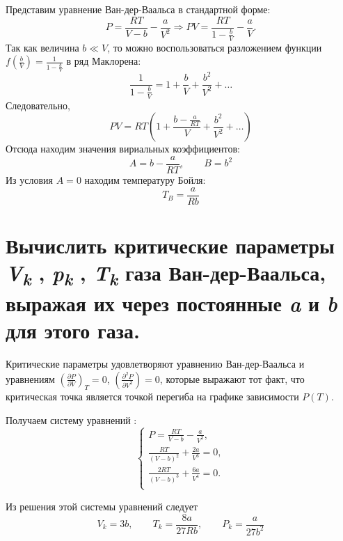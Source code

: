 Представим уравнение Ван-дер-Ваальса в стандартной форме:
\begin{equation}
  P = \frac{RT}{V-b} - \frac{a}{V^2} \Rightarrow PV = \frac{RT}{1 - \frac{b}{V}} - \frac{a}{V}.
\end{equation}
Так как величина $b \ll V$, то можно воспользоваться разложением функции $f\left ( \frac{b}{V} \right ) = \frac{1}{1 -\frac{b}{V}}$ в ряд Маклорена:
\begin{equation}
  \frac{1}{1 -\frac{b}{V}} = 1 + \frac{b}{V} + \frac{b^2}{V^2} + \ldots
\end{equation}
Следовательно,
\begin{equation}
  PV = RT \left (1 + \frac{b-\frac{a}{RT}}{V}+\frac{b^2}{V^2} + \ldots \right )
\end{equation}
Отсюда находим значения вириальных коэффициентов:
\begin{equation}
  A = b - \frac{a}{RT}, \qquad B = b^2
\end{equation}
Из условия $A = 0$ находим температуру Бойля:
\begin{equation}
  T_B = \frac{a}{Rb}
\end{equation}

\section{Вычислить критические параметры \emph{V\textsubscript{k}} ,
\emph{p\textsubscript{k}} , \emph{T\textsubscript{k}} газа
Ван-дер-Ваальса, выражая их через постоянные \emph{a} и \emph{b} для
этого газа.}

\solving{}

Критические параметры удовлетворяют уравнению Ван-дер-Ваальса и уравнениям $\left ( \frac{\partial P}{\partial V} \right )_T = 0$, $\left ( \frac{\partial^2 P}{\partial V^2} \right ) = 0$, которые выражают тот факт, что критическая точка является точкой
перегиба на графике зависимости $P(T)$.

Получаем систему уравнений :
\begin{equation}
  \begin{cases}
    P = \frac{RT}{V -b} - \frac{a}{V^2},\\
    \frac{RT}{(V-b)^2} + \frac{2a}{V^3} = 0, \\
    \frac{2RT}{(V-b)^3} + \frac{6a}{V^4} = 0. \\
  \end{cases}
\end{equation}

Из решения этой системы уравнений следует
\begin{equation}
  V_k = 3b, \qquad T_k = \frac{8a}{27Rb}, \qquad P_k = \frac{a}{27b^2}
\end{equation}


